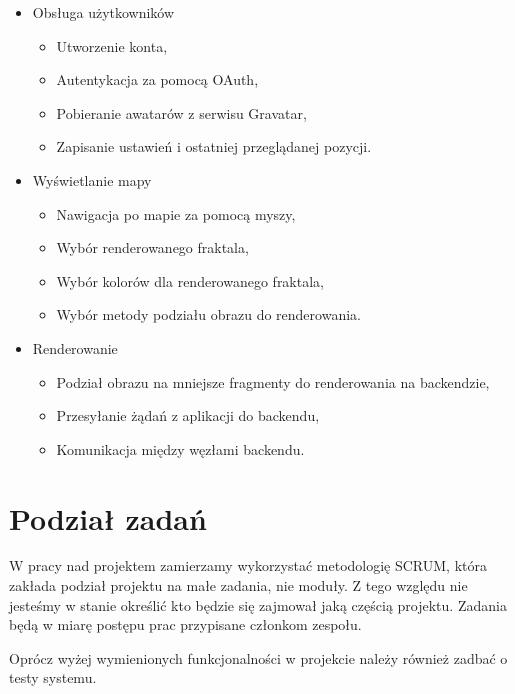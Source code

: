 \documentclass[wide,a4paper,titlepage,12pt]{article}
\begin{document}
\begin{itemize}
  \item Obsługa użytkowników
    \begin{itemize}
      \item Utworzenie konta,
      \item Autentykacja za pomocą OAuth,
      \item Pobieranie awatarów z serwisu Gravatar,
      \item Zapisanie ustawień i ostatniej przeglądanej pozycji.
    \end{itemize}
  \item Wyświetlanie mapy
    \begin{itemize}
      \item Nawigacja po mapie za pomocą myszy,
      \item Wybór renderowanego fraktala,
      \item Wybór kolorów dla renderowanego fraktala,
      \item Wybór metody podziału obrazu do renderowania.
    \end{itemize}
  \item Renderowanie
    \begin{itemize}
      \item Podział obrazu na mniejsze fragmenty do renderowania na backendzie,
      \item Przesyłanie żądań z aplikacji do backendu,
      \item Komunikacja między węzłami backendu.
    \end{itemize}
\end{itemize}

\section*{Podział zadań}

W pracy nad projektem zamierzamy wykorzystać metodologię SCRUM, która zakłada
podział projektu na małe zadania, nie moduły. Z tego względu nie jesteśmy
w stanie określić kto będzie się zajmował jaką częścią projektu. Zadania będą w
miarę postępu prac przypisane członkom zespołu.
\vspace{1em}

Oprócz wyżej wymienionych funkcjonalności w projekcie należy również zadbać o
testy systemu.
\end{document}
